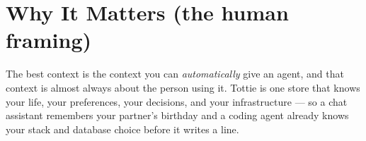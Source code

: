 \section{Why It Matters (the human framing)}
The best context is the context you can \emph{automatically} give an agent, and that context is
almost always about the person using it. Tottie is one store that knows your life, your preferences,
your decisions, and your infrastructure --- so a chat assistant remembers your partner's birthday
and a coding agent already knows your stack and database choice before it writes a line.
